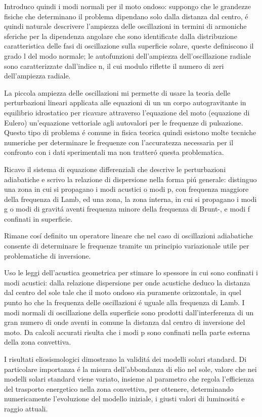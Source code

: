 \documentclass[../main.tex]{subfiles}
\begin{document}
Introduco quindi i modi normali per il moto ondoso: suppongo che le grandezze fisiche che determinano il problema dipendano solo dalla distanza dal centro, \'e quindi naturale descrivere l'ampiezza delle oscillazioni  in termini di armoniche sferiche per la dipendenza angolare che sono identificate dalla distribuzione caratteristica delle fasi di oscillazione sulla superficie solare, queste definiscono il grado l del modo normale; le autofunzioni dell'ampiezza dell'oscillazione radiale sono caratterizzate dall'indice n, il cui modulo riflette il numero di zeri dell'ampiezza radiale.

La piccola ampiezza delle oscillazioni mi permette di usare la teoria delle perturbazioni lineari applicata alle equazioni di un un corpo autogravitante in equilibrio idrostatico per ricavare attraverso l'equazione del moto (equazione di Eulero) un'equazione vettoriale agli autovalori per le frequenze di pulsazione. Questo tipo di problema \'e comune in fisica teorica quindi esistono molte tecniche numeriche per determinare le frequenze con l'accuratezza necessaria per il confronto con i dati sperimentali ma non tratter\'o questa problematica.


Ricavo il sistema di equazione differenziali che descrive le perturbazioni adiabatiche e scrivo la relazione di dispersione nella forma pi\'u generale: distinguo una zona in cui si propagano i modi acustici o modi p, con frequenza maggiore della frequenza di Lamb, ed una zona, la zona interna, in cui si propagano i modi g o modi di gravit\'a aventi frequenza minore della frequenza di Brunt-\vai{}, e modi f confinati in superficie. 


Rimane cos\'i definito un operatore lineare che nel caso di oscillazioni adiabatiche consente di determinare le frequenze tramite un principio variazionale utile per problematiche di inversione. 

Uso le leggi dell'acustica geometrica per stimare lo spessore in cui sono confinati i modi acustici: dalla relazione dispersione per onde acustiche deduco la distanza dal centro del sole tale che il moto ondoso sia puramente orizzontale, in quel punto ho che la frequenza delle oscillazioni \'e uguale alla frequenza di Lamb. I modi normali di oscillazione della superficie sono prodotti dall'interferenza di un gran numero di onde aventi in comune la distanza dal centro di inversione del moto. Da calcoli accurati risulta che i modi p sono confinati nella parte esterna della zona convettiva. 

I risultati eliosismologici dimostrano la validit\'a dei modelli solari standard. Di particolare importanza \'e la  misura  dell'abbondanza di elio nel sole, valore che nei modelli solari standard viene variato, insieme al parametro che regola l'efficienza del trasporto energetico nella zona convettiva, per ottenere, determinando numericamente l'evoluzione del modello iniziale, i giusti valori di luminosit\'a e raggio attuali.
\end{document}
